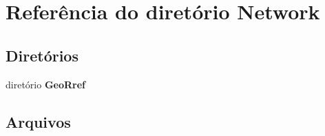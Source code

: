 \section{Referência do diretório Network}
\label{dir_0c0333544ec44c57ec7d33d873fe36a2}
\subsection*{Diretórios}
\begin{DoxyCompactItemize}
\item 
diretório {\bf Geo\+Rref}
\end{DoxyCompactItemize}
\subsection*{Arquivos}
